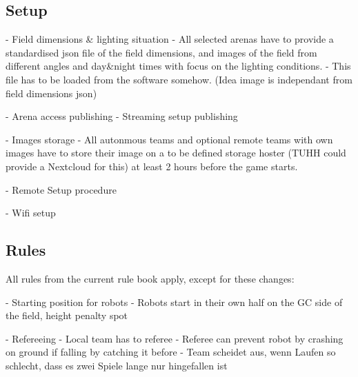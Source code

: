 \subsection{Setup}

- Field dimensions \& lighting situation
    - All selected arenas have to provide a standardised json file of the field dimensions, and images of the field from different angles and day\&night times with focus on the lighting conditions.
    - This file has to be loaded from the software somehow. (Idea image is independant from field dimensions json)

- Arena access publishing
- Streaming setup  publishing

- Images storage
    - All autonmous teams and optional remote teams with own images have to store their image on a to be defined storage hoster (TUHH could provide a Nextcloud for this) at least 2 hours before the game starts.

- Remote Setup procedure

- Wifi setup

\subsection{Rules}
All rules from the current rule book apply, except for these changes:

- Starting position for robots
    - Robots start in their own half on the GC side of the field, height penalty spot

- Refereeing
    - Local team has to referee
    - Referee can prevent robot by crashing on ground if falling by catching it before
    - Team scheidet aus, wenn Laufen so schlecht, dass es zwei Spiele lange nur hingefallen ist

